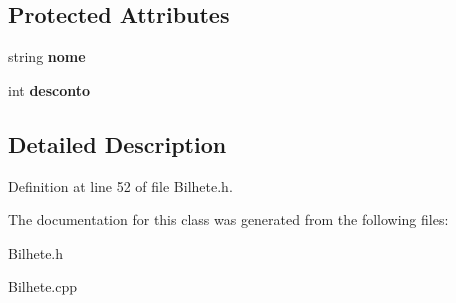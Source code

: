 \subsection*{Protected Attributes}
\begin{DoxyCompactItemize}
\item 
\mbox{\label{classAssinatura_ab0d294c73c43512e7f7949ca96d9a08d}} 
string {\bfseries nome}
\item 
\mbox{\label{classAssinatura_a4ad19095f61368524a75eb73db658ff9}} 
int {\bfseries desconto}
\end{DoxyCompactItemize}


\subsection{Detailed Description}


Definition at line 52 of file Bilhete.\+h.



The documentation for this class was generated from the following files\+:\begin{DoxyCompactItemize}
\item 
Bilhete.\+h\item 
Bilhete.\+cpp\end{DoxyCompactItemize}
